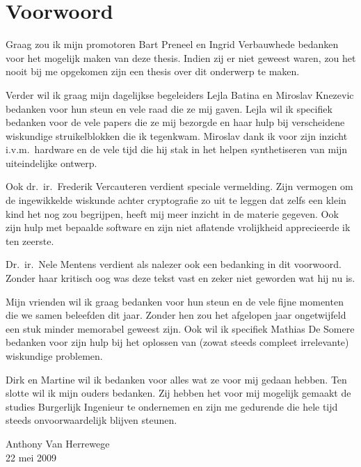 \chapter*{Voorwoord}

Graag zou ik mijn promotoren Bart Preneel en Ingrid Verbauwhede bedanken voor het mogelijk maken van deze thesis. Indien zij er niet geweest waren, zou het nooit bij me opgekomen zijn een thesis over dit onderwerp te maken.

Verder wil ik graag mijn dagelijkse begeleiders Lejla Batina en Miroslav Knezevic bedanken voor hun steun en vele raad die ze mij gaven. Lejla wil ik specifiek bedanken voor de vele papers die ze mij bezorgde en haar hulp bij verscheidene wiskundige struikelblokken die ik tegenkwam. Miroslav dank ik voor zijn inzicht i.v.m.\ hardware en de vele tijd die hij stak in het helpen synthetiseren van mijn uiteindelijke ontwerp.

Ook dr.\ ir.\ Frederik Vercauteren verdient speciale vermelding. Zijn vermogen om de ingewikkelde wiskunde achter cryptografie zo uit te leggen dat zelfs een klein kind het nog zou begrijpen, heeft mij meer inzicht in de materie gegeven. Ook zijn hulp met bepaalde software en zijn niet aflatende vrolijkheid apprecieerde ik ten zeerste.

Dr.\ ir.\ Nele Mentens verdient als nalezer ook een bedanking in dit voorwoord. Zonder haar kritisch oog was deze tekst vast en zeker niet geworden wat hij nu is.

Mijn vrienden wil ik graag bedanken voor hun steun en de vele fijne momenten die we samen beleefden dit jaar. Zonder hen zou het afgelopen jaar ongetwijfeld een stuk minder memorabel geweest zijn. Ook wil ik specifiek Mathias De Somere bedanken voor zijn hulp bij het oplossen van (zowat steeds compleet irrelevante) wiskundige problemen.

Dirk en Martine wil ik bedanken voor alles wat ze voor mij gedaan hebben. Ten slotte wil ik mijn ouders bedanken. Zij hebben het voor mij mogelijk gemaakt de studies Burgerlijk Ingenieur te ondernemen en zijn me gedurende die hele tijd steeds onvoorwaardelijk blijven steunen. 

\bigskip \bigskip
{\raggedleft	%
Anthony Van Herrewege\\
22 mei 2009\\
}
